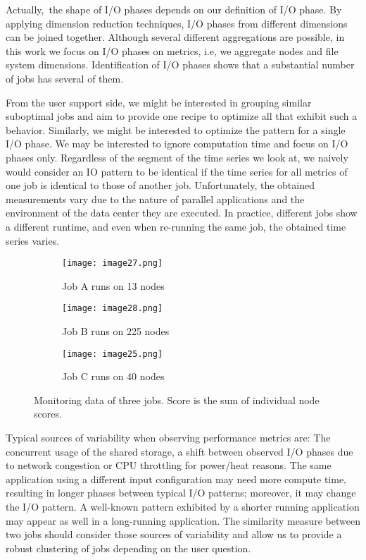 \documentclass{jhps}
\begin{document}
Actually,\ the shape of I/O phases depends on our definition of I/O phase.
By applying dimension reduction techniques, I/O phases from different dimensions can be joined together.
Although several different aggregations are possible, in this work we focus on  I/O phases on metrics, i.e, we aggregate nodes and file system dimensions.
Identification of I/O phases shows that a substantial number of jobs has several of them.

From the user support side, we might be interested in grouping similar suboptimal jobs and aim to provide one recipe to optimize all that exhibit such a behavior.
Similarly, we might be interested to optimize the pattern for a single I/O phase.
We may be interested to ignore computation time and focus on I/O phases only.
Regardless of the segment of the time series we look at, we naively would consider an IO pattern to be identical if the time series for all metrics of one job is identical to those of another job.
Unfortunately, the obtained measurements vary due to the nature of parallel applications and the environment of the data center they are executed.
In practice, different jobs show a different runtime, and even when re-running the same job, the obtained time series varies.

\begin{figure}
        \centering
         \begin{subfigure}[t]{\textwidth}
           \texttt{[image: image27.png]}
           \caption{Job A runs on 13 nodes}
           \label{fig:typ_io:1}
         \end{subfigure}

        \begin{subfigure}[t]{\textwidth}
           \texttt{[image: image28.png]}
           \caption{Job B runs on 225 nodes}
           \label{fig:typ_io:2}
         \end{subfigure}

        \begin{subfigure}[t]{\textwidth}
          \texttt{[image: image25.png]}
          \caption{Job C runs on 40 nodes}
          \label{fig:typ_io:3}
        \end{subfigure}
\caption{Monitoring data of three jobs.
Score is the sum of individual node scores.}
         \label{fig:typ_io:all}
\end{figure}

Typical sources of variability when observing performance metrics are: The concurrent usage of the shared storage, a shift between observed I/O phases due to network congestion or CPU throttling for power/heat reasons.
The same application using a different input configuration may need more compute time, resulting in longer phases between typical I/O patterns; moreover, it may change the I/O pattern.
A well-known pattern exhibited by a shorter running application may appear as well in a long-running application.
The similarity measure between two jobs should consider those sources of variability and allow us to provide a robust clustering of jobs depending on the user question.
\end{document}
